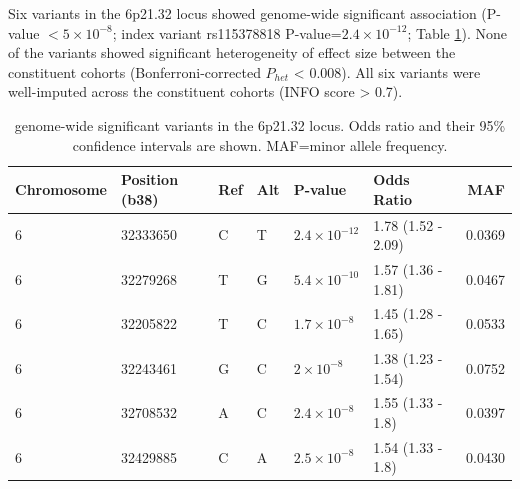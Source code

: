 
    Six variants in the 6p21.32 locus showed genome-wide significant association (P-value $< 5\times10^{-8}$; index variant rs115378818 P-value=$2.4\times10^{-12}$; Table \ref{table:gws}). None of the variants showed significant heterogeneity of effect size between the constituent cohorts (Bonferroni-corrected $P_{het}$ < 0.008). All six variants were well-imputed across the constituent cohorts (INFO score > 0.7).
  
  \begin{table}[htb]
    \centering\begingroup\fontsize{10}{14}\selectfont
    \caption{genome-wide significant variants in the 6p21.32 locus. Odds ratio and their 95\% confidence intervals are shown. MAF=minor allele frequency.}
    \label{table:gws}
    \begin{tabular}[t]{|l|l|l|l|l|l|r|}
      
    \hline
    Chromosome & Position (b38) & Ref & Alt & P-value & Odds Ratio & MAF\\
    \hline
    6 & 32333650 & C & T & $2.4\times10^{-12}$ & 1.78 (1.52 - 2.09) & 0.0369\\
    \hline
    6 & 32279268 & T & G & $5.4\times10^{-10}$ & 1.57 (1.36 - 1.81) & 0.0467\\
    \hline
    6 & 32205822 & T & C & $1.7\times10^{-8}$ & 1.45 (1.28 - 1.65) & 0.0533\\
    \hline
    6 & 32243461 & G & C & $2\times10^{-8}$ & 1.38 (1.23 - 1.54) & 0.0752\\
    \hline
    6 & 32708532 & A & C & 2.$4\times10^{-8}$ & 1.55 (1.33 - 1.8) & 0.0397\\
    \hline
    6 & 32429885 & C & A & $2.5\times10^{-8}$ & 1.54 (1.33 - 1.8) & 0.0430\\
    \hline
    \end{tabular}

    \endgroup{}

    \end{table}
    
